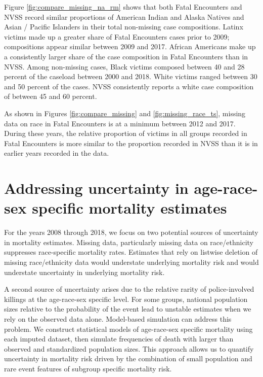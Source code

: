 \documentclass{article}
\begin{document}
Figure \ref{fig:compare_missing_na_rm} shows that both Fatal Encounters and NVSS record similar proportions of American Indian and Alaska Natives and Asian / Pacific Islanders in their total non-missing case compositions. Latinx victims made up a greater share of Fatal Encounters cases prior to 2009; compositions appear similar between 2009 and 2017. African Americans make up a consistently larger share of the case composition in Fatal Encounters than in NVSS. Among non-missing cases, Black victims composed between 40 and 28 percent of the caseload between 2000 and 2018. White victims ranged between 30 and 50 percent of the cases. NVSS consistently reports a white case composition of between 45 and 60 percent. 

As shown in Figures \ref{fig:compare_missing} and \ref{fig:missing_race_ts}, missing data on race in Fatal Encounters is at a minimum between 2012 and 2017. During these years, the relative proportion of victims in all groups recorded in Fatal Encounters is more similar to the proportion recorded in NVSS than it is in earlier years recorded in the data. 

\section{Addressing uncertainty in age-race-sex specific mortality estimates}

For the years 2008 through 2018, we focus on two potential sources of uncertainty in mortality estimates. Missing data, particularly missing data on race/ethnicity suppresses race-specific mortality rates. Estimates that rely on listwise deletion of missing race/ethnicity data would understate underlying mortality risk and would understate uncertainty in underlying mortality risk. 

A second source of uncertainty arises due to the relative rarity of police-involved killings at the age-race-sex specific level. For some groups, national population sizes relative to the probability of the event lead to unstable estimates when we rely on the observed data alone. Model-based simulation can address this problem. We construct statistical models of age-race-sex specific mortality using each imputed dataset, then simulate frequencies of death with larger than observed and standardized population sizes. This approach allows us to quantify uncertainty in mortality risk driven by the combination of small population and rare event features of subgroup specific mortality risk. 
\end{document}
